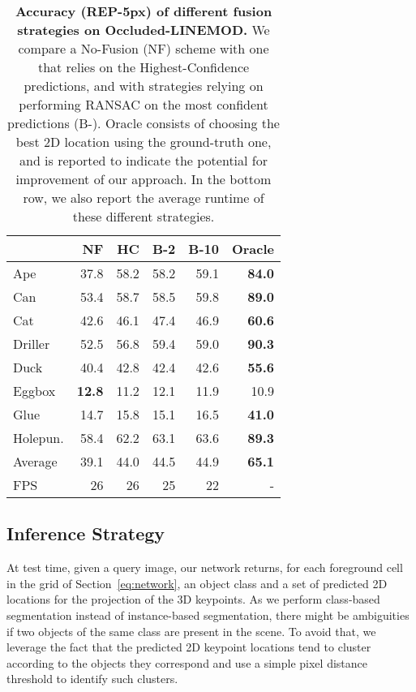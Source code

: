 \documentclass[10pt,twocolumn,letterpaper]{article}
\begin{document}
\begin{table}
	\centering
	\begin{tabular}{lrrrrr}
	\toprule
	&	NF & HC	& B-2 & B-10	&	Oracle	\\
	\midrule
	Ape			&37.8&58.2&58.2&59.1&{\bf 84.0} \\
	Can			&53.4&58.7&58.5&59.8&{\bf 89.0} \\
	Cat 		&42.6&46.1&47.4&46.9&{\bf 60.6} \\
	Driller		&52.5&56.8&59.4&59.0&{\bf 90.3} \\
	Duck		&40.4&42.8&42.4&42.6&{\bf 55.6} \\
	Eggbox	&{\bf 12.8}&11.2&12.1&11.9& 10.9 \\
	Glue	&14.7&15.8&15.1&16.5&{\bf 41.0} \\
	Holepun.	&58.4&62.2&63.1&63.6&{\bf 89.3} \\
	\midrule
	Average		&39.1&44.0&44.5&44.9&{\bf 65.1} \\
	\bottomrule
	FPS	& 26	& 26	&	25 & 22	& - \\
	\end{tabular}
	\vspace{-3mm}
	\caption{{\bf Accuracy (REP-5px) of different fusion strategies on Occluded-LINEMOD.} We compare a No-Fusion (NF) scheme with one that relies on the Highest-Confidence predictions, and with strategies relying on performing RANSAC on the  most confident predictions (B-). Oracle consists of choosing the best 2D location using the ground-truth one, and is reported to indicate the potential for improvement of our approach. In the bottom row, we also report the average runtime of these different strategies.}
\label{tab:different_inference}
\end{table} 
 
\subsection{Inference Strategy}
\label{sec:inference}

At test time, given a query image, our network returns, for each foreground cell in the  grid of Section~\ref{eq:network}, an object class and a set of predicted 2D locations for the projection of the  3D keypoints. As we perform class-based segmentation instead of instance-based segmentation, there might  be ambiguities if two objects of the same class are present in the scene. To avoid that,  we leverage the fact that the predicted 2D keypoint locations tend to cluster according to the objects they correspond and use a simple pixel distance threshold to identify such clusters.
\end{document}
